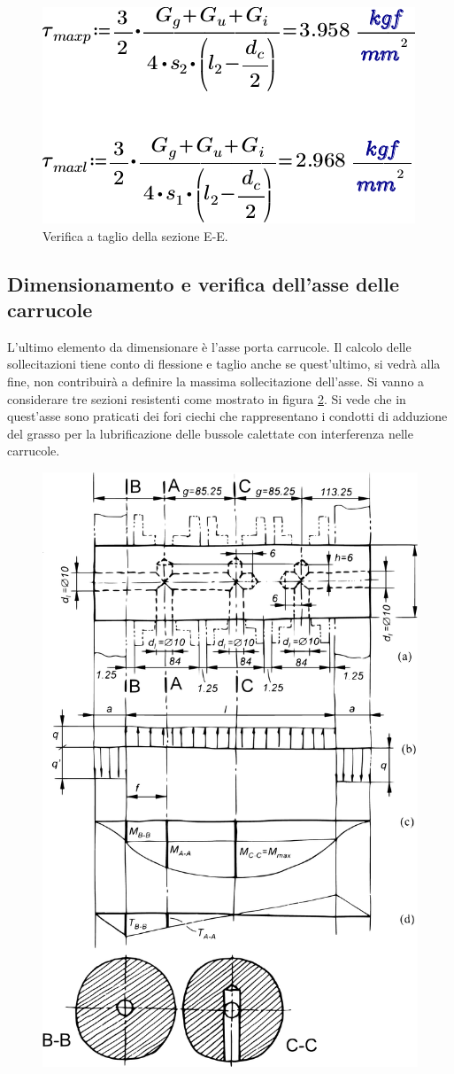 \begin{figure}[H]
\centering
  \includegraphics[width=.4\textwidth]{imgs/MathTrav6}
\caption{Verifica a taglio della sezione E-E.}
\label{fig:MathTrav6}
\end{figure}
\vfill
\clearpage
\subsection{Dimensionamento e verifica dell'asse delle carrucole}
L'ultimo elemento da dimensionare è l'asse porta carrucole. Il calcolo delle sollecitazioni tiene conto di flessione e taglio anche se quest'ultimo, si vedrà alla fine, non contribuirà a definire la massima sollecitazione dell'asse.
Si vanno a considerare tre sezioni resistenti come mostrato in figura \ref{fig:AsseDisegno}. 
Si vede che in quest'asse sono praticati dei fori ciechi che rappresentano i condotti di adduzione del grasso per la lubrificazione delle bussole calettate con interferenza nelle carrucole.
\begin{figure}[H]
\centering
  \includegraphics[width=.7\textwidth]{imgs/AsseDisegno}
\caption{}
\label{fig:AsseDisegno}
\end{figure}
